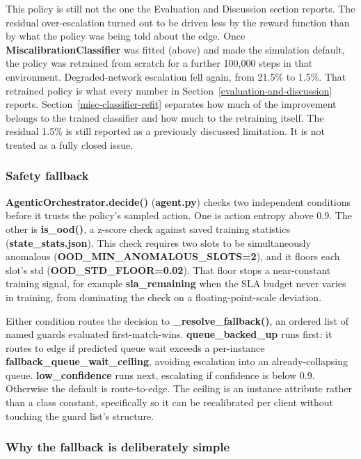This policy is still not the one the Evaluation and Discussion section
reports. The residual over-escalation turned out to be driven less by
the reward function than by what the policy was being told about the
edge. Once \textbf{MiscalibrationClassifier} was fitted (above) and made
the simulation default, the policy was retrained from scratch for a
further 100,000 steps in that environment. Degraded-network escalation
fell again, from 21.5\% to 1.5\%. That retrained policy is what every
number in Section~\ref{evaluation-and-discussion} reports. Section~\ref{misc-classifier-refit} separates how much of the
improvement belongs to the trained classifier and how much to the
retraining itself. The residual 1.5\% is still reported as a previously discussed
limitation. It is not treated as a fully closed issue.

\hypertarget{safety-fallback}{%
\subsubsection{Safety fallback}\label{safety-fallback}}

\textbf{AgenticOrchestrator.decide()} (\textbf{agent.py}) checks two independent
conditions before it trusts the policy's sampled action. One is action
entropy above 0.9. The other is \textbf{is\_ood()}, a z-score check against
saved training statistics (\textbf{state\_stats.json}). This check requires
two slots to be simultaneously anomalous
(\textbf{OOD\_MIN\_ANOMALOUS\_SLOTS=2}), and it floors each
slot's std (\textbf{OOD\_STD\_FLOOR=0.02}). That floor stops a near-constant
training signal, for example \textbf{sla\_remaining} when the SLA budget never
varies in training, from dominating the check on a floating-point-scale
deviation.

Either condition routes the decision to \textbf{\_resolve\_fallback()}, an
ordered list of named guards evaluated first-match-wins.
\textbf{queue\_backed\_up} runs first: it routes to edge if predicted queue
wait exceeds a per-instance \textbf{fallback\_queue\_wait\_ceiling}, avoiding
escalation into an already-collapsing queue. \textbf{low\_confidence} runs
next, escalating if confidence is below 0.9. Otherwise the default is
route-to-edge. The ceiling is an instance attribute rather than a
class constant, specifically so it can be recalibrated per client without
touching the guard list's structure.

\hypertarget{why-the-fallback-is-deliberately-simple}{%
\subsubsection{Why the fallback is deliberately
simple}\label{why-the-fallback-is-deliberately-simple}}

